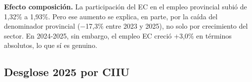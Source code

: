 \documentclass[
  spanish,
  letterpaper,
  DIV=11,
  numbers=noendperiod]{scrartcl}
\begin{document}
\begin{tcolorbox}[enhanced jigsaw, arc=.35mm, bottomrule=.15mm, bottomtitle=1mm, breakable, colback=white, colbacktitle=quarto-callout-important-color!10!white, colframe=quarto-callout-important-color-frame, coltitle=black, left=2mm, leftrule=.75mm, opacityback=0, opacitybacktitle=0.6, rightrule=.15mm, title=\textcolor{quarto-callout-important-color}{\faExclamation}\hspace{0.5em}{Importante}, titlerule=0mm, toprule=.15mm, toptitle=1mm]

\textbf{Efecto composición.} La participación del EC en el empleo
provincial subió de 1,32\% a 1,93\%. Pero ese aumento se explica, en
parte, por la caída del denominador provincial (−17,3\% entre 2023 y
2025), no solo por crecimiento del sector. En 2024-2025, sin embargo, el
empleo EC creció +3,0\% en términos absolutos, lo que sí es genuino.

\end{tcolorbox}

\subsection{Desglose 2025 por CIIU}\label{desglose-2025-por-ciiu}
\end{document}
